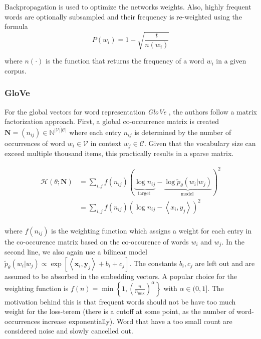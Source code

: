 \documentclass[a4paper,12pt,oneside,openright]{report}
\begin{document}
Backpropagation is used to optimize the networks weights. 
Also, highly frequent words are optionally subsampled and their frequency is re-weighted using the formula $$
P\left(w_{i}\right)=1-\sqrt{\frac{t}{n\left(w_{i}\right)}}
$$

where $n( \cdot )$ is the function that returns the frequency of a word $w_i$ in a given corpus.

\subsubsection{GloVe}

For the global vectors for word representation \textit{GloVe} \cite{pennington14}, the authors follow a matrix factorization approach.
First, a global co-occurrence matrix is created $\mathbf{N} = (n_{ij}) \in \mathbb{N}^{|\mathcal{V}| \dot |\mathcal{C}|}$ where each entry $n_{ij}$ is determined by the number of occurrences of word $w_i \in \mathcal{V}$ in context $w_j \in \mathcal{C}$.
Given that the vocabulary size can exceed multiple thousand items, this practically results in a sparse matrix.

\begin{align}
\mathcal{H}(\theta ; \mathbf{N}) &=
\sum_{i, j} f\left(n_{i j}\right)(\underbrace{\log n_{i j}}_{\text {target }}-\underbrace{\log \tilde{p}_{\theta}\left(w_{i} | w_{j}\right)}_{\text {model }})^{2} \\
&= \sum_{i, j} f\left(n_{i j}\right)(\log n_{i j} - \left\langle x_i, y_j \right\rangle )^{2} \\
\end{align}

where $f(n_{ij})$ is the weighting function which assigns a weight for each entry in the co-occurence matrix based on the co-occurence of words $w_i$ and $w_j$. 
In the second line, we also again use a bilinear model $\tilde{p}_{\theta}\left(w_{i} | w_{j}\right) \propto \exp \left[\left\langle\mathbf{x}_{i}, \mathbf{y}_{j}\right\rangle+b_{i}+c_{j}\right]$.
The constants $b_i, c_j$ are left out and are assumed to be absorbed in the embedding vectors.
A popular choice for the weighting function is 
$
f(n) = \min \left\lbrace 1, \left(\frac{n}{n_{\max}}\right)^{\alpha} \right\rbrace
$
with $\alpha \in (0, 1]$.
The motivation behind this is that frequent words should not be have too much weight for the loss-terem (there is a cutoff at some point, as the number of word-occurrences increase exponentially).
Word that have a too small count are considered noise and slowly cancelled out. \\
\end{document}
